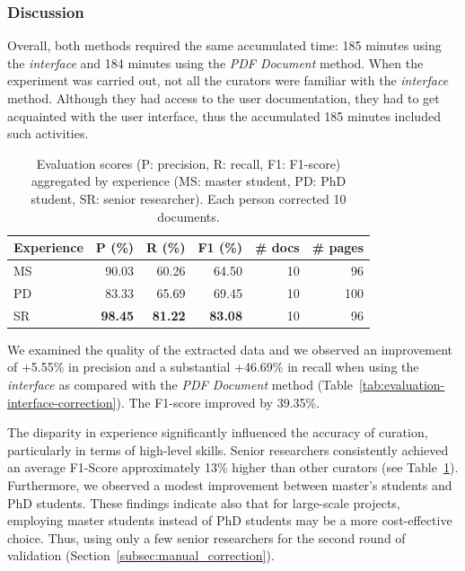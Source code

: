\subsubsection{Discussion}
Overall, both methods required the same accumulated time: 185 minutes using the \textit{interface} and 184 minutes using the \textit{PDF Document} method.
When the experiment was carried out, not all the curators were familiar with the \textit{interface} method. Although they had access to the user documentation, they had to get acquainted with the user interface, thus the accumulated 185 minutes included such activities. 

\begin{table}[h]
\centering
\caption{Evaluation scores (P: precision, R: recall, F1: F1-score) aggregated by experience (MS: master student, PD: PhD student, SR: senior researcher). Each person corrected 10 documents.}
\begin{tabular}{lrrrrr}
\toprule
\textbf{Experience} & \textbf{P (\%)}   & \textbf{R (\%)}   & \textbf{F1 (\%)}  & \textbf{\#  docs} & \textbf{\# pages}\\
\midrule
MS      & 90.03             & 60.26             & 64.50           & 10  & 96    \\
PD      & 83.33             & 65.69             & 69.45           & 10  & 100   \\
SR      & \textbf{98.45}    & \textbf{81.22}    & \textbf{83.08}  & 10  & 96  \\
\bottomrule
\end{tabular}
\label{tab:accuracy-by-experience}
\end{table}

We examined the quality of the extracted data and we observed an improvement of +5.55\% in precision and a substantial +46.69\% in recall when using the \textit{interface} as compared with the \textit{PDF Document} method (Table~\ref{tab:evaluation-interface-correction}). 
The F1-score improved by 39.35\%.

The disparity in experience significantly influenced the accuracy of curation, particularly in terms of high-level skills. Senior researchers consistently achieved an average F1-Score approximately 13\% higher than other curators (see Table~\ref{tab:accuracy-by-experience}). Furthermore, we observed a modest improvement between master's students and PhD students. These findings indicate also that for large-scale projects, employing master students instead of PhD students may be a more cost-effective choice. Thus, using only a few senior researchers for the second round of validation (Section~\ref{subsec:manual_correction}).

